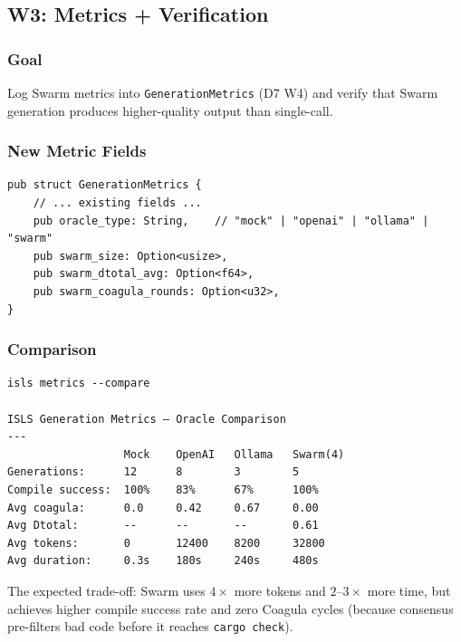 \documentclass[11pt,a4paper]{article}
\begin{document}
\subsection{W3: Metrics + Verification}
\label{sec:w3}

\subsubsection{Goal}

Log Swarm metrics into \texttt{GenerationMetrics} (D7 W4) and 
verify that Swarm generation produces higher-quality output 
than single-call.

\subsubsection{New Metric Fields}

\begin{lstlisting}[style=rust]
pub struct GenerationMetrics {
    // ... existing fields ...
    pub oracle_type: String,    // "mock" | "openai" | "ollama" | "swarm"
    pub swarm_size: Option<usize>,
    pub swarm_dtotal_avg: Option<f64>,
    pub swarm_coagula_rounds: Option<u32>,
}
\end{lstlisting}

\subsubsection{Comparison}

\begin{lstlisting}[style=bash]
isls metrics --compare

ISLS Generation Metrics — Oracle Comparison
---
                  Mock    OpenAI   Ollama   Swarm(4)
Generations:      12      8        3        5
Compile success:  100%    83%      67%      100%
Avg coagula:      0.0     0.42     0.67     0.00
Avg Dtotal:       --      --       --       0.61
Avg tokens:       0       12400    8200     32800
Avg duration:     0.3s    180s     240s     480s
\end{lstlisting}

The expected trade-off: Swarm uses $4\times$ more tokens and 
$2\text{--}3\times$ more time, but achieves higher compile 
success rate and zero Coagula cycles (because consensus 
pre-filters bad code before it reaches \texttt{cargo check}).
\end{document}
